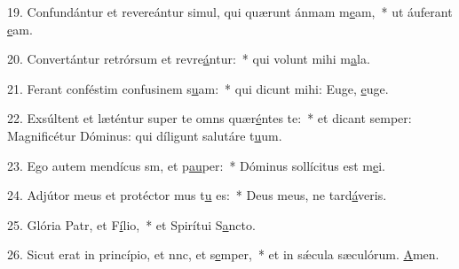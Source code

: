 19. Confundántur et revereántur simul, qui quærunt ánmam m\uline{e}am,~* ut áuferant \uline{e}am.\par 
20. Convertántur retrórsum et revre\uline{á}ntur:~* qui volunt mihi m\uline{a}la.\par 
21. Ferant conféstim confusinem s\uline{u}am:~* qui dicunt mihi: Euge, \uline{e}uge.\par 
22. Exsúltent et læténtur super te omns quær\uline{é}ntes te:~* et dicant semper: Magnificétur Dóminus: qui díligunt salutáre t\uline{u}um.\par 
23. Ego autem mendícus sm, et p\uline{au}per:~* Dóminus sollícitus est m\uline{e}i.\par 
24. Adjútor meus et protéctor mus t\uline{u} es:~* Deus meus, ne tard\uline{á}veris.\par 
25. Glória Patr, et F\uline{í}lio,~* et Spirítui S\uline{a}ncto.\par 
26. Sicut erat in princípio, et nnc, et s\uline{e}mper,~* et in sǽcula sæculórum. \uline{A}men.\par 
